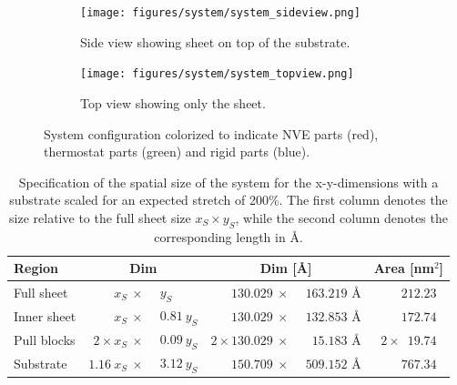\begin{figure}[H]
  \centering
  \begin{subfigure}[b]{0.80\textwidth}
      \centering
      \texttt{[image: figures/system/system\_sideview.png]}
      \caption{Side view showing sheet on top of the substrate.}
      \label{fig:sideview}
  \end{subfigure}
  \hfill
  \begin{subfigure}[b]{0.80\textwidth}
      \centering
      \texttt{[image: figures/system/system\_topview.png]}
      \caption{Top view showing only the sheet.}
      \label{fig:topview}
  \end{subfigure}
  \hfill
     \caption{System configuration colorized to indicate NVE parts (red), thermostat parts (green) and rigid parts (blue).}
     \label{fig:system}
\end{figure}



\begin{table}[H]
  \begin{center}
  \caption{Specification of the spatial size of the system for the x-y-dimensions with a substrate scaled for an expected stretch of 200\%. The first column denotes the size relative to the full sheet size $x_S \times y_S$, while the second column denotes the corresponding length in Å.}
  \label{tab:sheet_dim}
  \begin{tabular}{ | l | r@{}l | r@{}l | c |} \hline
    \textbf{Region} & \multicolumn{2}{c|}{Dim} & \multicolumn{2}{c|}{Dim
    [Å]} & Area [nm$^2$]\\ \hline
  Full sheet & $x_S \: \times \: $ & $y_S$ &  $130.029 \: \times \:$ & $163.219$ Å & $\phantom{2\times} 212.23$ \\ \hline
  Inner sheet & $x_S \: \times \:$ & $0.81 \ y_S$ &  $130.029  \: \times \:$ & $132.853$ Å & $\phantom{2\times} 172.74$\\ \hline
  Pull blocks & $2 \times x_S \: \times \:$ & $ 0.09 \ y_S$ & $2 \times 130.029  \: \times \: $ & $\phantom{0}15.183$ Å  & $2 \times \phantom{0}19.74$ \\ \hline  
  Substrate & $1.16 \ x_S \: \times \:$ & $3.12 \ y_S$ &  $150.709  \: \times \:$ & $509.152$ Å & $\phantom{2\times} 767.34$\\ \hline
\end{tabular}
\end{center}
\end{table}



